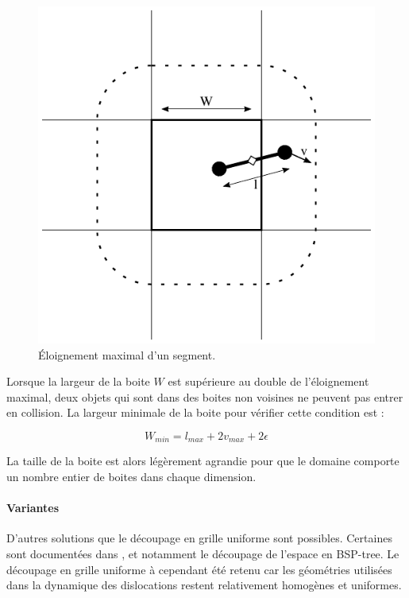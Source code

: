 \documentclass[11pt,class=article,float=false,crop=false]{standalone}
\begin{document}
\begin{figure}[H]
	\centering
	\includegraphics[height=0.3\textheight]{img/taille_boite}
	\caption{Éloignement maximal d'un segment.}
	\label{fig:taille-boite}
\end{figure}

Lorsque la largeur de la boite $W$ est supérieure au double de l'éloignement maximal, deux objets qui sont dans des boites non voisines ne peuvent pas entrer en collision. La largeur minimale de la boite pour vérifier cette condition est :

\begin{equation}
W_{min} = l_{max} + 2v_{max} + 2\epsilon
\end{equation}

La taille de la boite est alors légèrement agrandie pour que le domaine comporte un nombre entier de boites dans chaque dimension. 

\paragraph{Variantes}
D'autres solutions que le découpage en grille uniforme sont possibles. Certaines sont documentées dans , et notamment le découpage de l'espace en BSP-tree. Le découpage en grille uniforme à cependant été retenu car les géométries utilisées dans la dynamique des dislocations restent relativement homogènes et uniformes.
\end{document}
